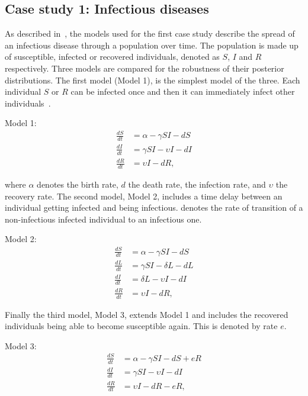 \clearpage
\subsection{Case study 1: Infectious diseases}
\label{sec:cs1}

As described in~\textcite{Toni:2009tr}, the models used for the first case study describe the spread of an infectious disease through a population over time. The population is made up of susceptible, infected or recovered individuals, denoted as $S$, $I$ and $R$ respectively. Three models are compared for the robustness of their posterior distributions. The first model (Model 1), is the simplest model of the three. Each individual $S$ or $R$ can be infected once and then it can immediately infect other individuals~\autocite{Toni:2009tr}.

\noindent Model 1:
\begin{align*}
\frac{dS}{dt} &= \alpha - \gamma SI - dS \\
\frac{dI}{dt} &= \gamma SI - \upsilon I - dI \\
\frac{dR}{dt} &= \upsilon I - dR,
\end{align*}

\noindent where $\alpha$ denotes the birth rate, $d$ the death rate, \textgamma{} the infection rate, and $\upsilon$ the recovery rate. The second model, Model 2, includes a time delay between an individual getting infected and being infectious. \textdelta{} denotes the rate of transition of a non-infectious infected individual to an infectious one.

\noindent Model 2:
\begin{align*}
\frac{dS}{dt} &= \alpha - \gamma SI - dS \\
\frac{dL}{dt} &= \gamma SI - \delta L - dL \\
\frac{dI}{dt} &= \delta L - \upsilon I - dI \\
\frac{dR}{dt} &= \upsilon I - dR,
\end{align*}

\noindent Finally the third model, Model 3, extends Model 1 and includes the recovered individuals being able to become susceptible again. This is denoted by rate $e$.

\noindent Model 3:
\begin{align*}
\frac{dS}{dt} &= \alpha - \gamma SI - dS + eR\\
\frac{dI}{dt} &= \gamma SI - \upsilon I - dI \\
\frac{dR}{dt} &= \upsilon I - dR - eR,
\end{align*}


